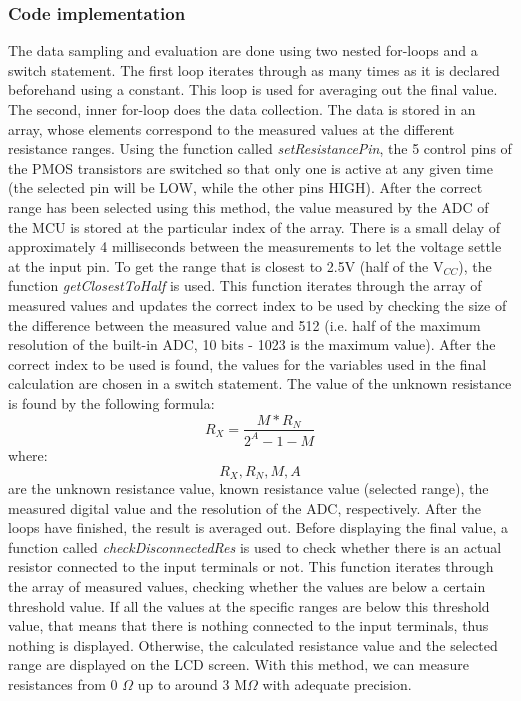 \subsubsection{Code implementation}
\label{sec:method_resistance_code}
The data sampling and evaluation are done using two nested for-loops and a switch statement. The first loop iterates through as many times as it is declared beforehand using a constant. This loop is used for averaging out the final value. The second, inner for-loop does the data collection. The data is stored in an array, whose elements correspond to the measured values at the different resistance ranges. Using the function called \textit{setResistancePin}, the 5 control pins of the PMOS transistors are switched so that only one is active at any given time (the selected pin will be LOW, while the other pins HIGH). After the correct range has been selected using this method, the value measured by the ADC of the MCU is stored at the particular index of the array. There is a small delay of approximately 4 milliseconds between the measurements to let the voltage settle at the input pin. To get the range that is closest to 2.5V (half of the V$_{CC}$), the function \textit{getClosestToHalf} is used. This function iterates through the array of measured values and updates the correct index to be used by checking the size of the difference between the measured value and 512 (i.e. half of the maximum resolution of the built-in ADC, 10 bits - 1023 is the maximum value). After the correct index to be used is found, the values for the variables used in the final calculation are chosen in a switch statement. The value of the unknown resistance is found by the following formula:
\vspace{1cm}\[R_X=\frac{M*R_N}{2^A-1-M}\]
where: \[R_X , R_N , M , A\] are the unknown resistance value, known resistance value (selected range), the measured digital value and the resolution of the ADC, respectively. After the loops have finished, the result is averaged out. Before displaying the final value, a function called \textit{checkDisconnectedRes} is used to check whether there is an actual resistor connected to the input terminals or not. This function iterates through the array of measured values, checking whether the values are below a certain threshold value. If all the values at the specific ranges are below this threshold value, that means that there is nothing connected to the input terminals, thus nothing is displayed. Otherwise, the calculated resistance value and the selected range are displayed on the LCD screen. With this method, we can measure resistances from 0 $\Omega$ up to around 3 M$\Omega$ with adequate precision.

